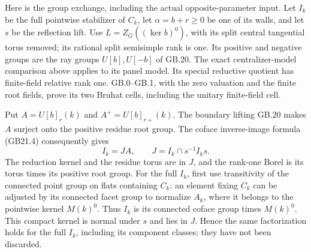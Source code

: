 \documentclass[
  11pt,
]{article}
\begin{document}
Here is the group exchange, including the actual opposite-parameter
input. Let \(I_k\) be the full pointwise stabilizer of \(C_k\), let
\(\alpha=b+r\geq0\) be one of its walls, and let \(s\) be the reflection
lift. Use \(L=Z_G((\ker b)^0)\), with its split central tangential torus
removed; its rational split semisimple rank is one. Its positive and
negative groups are the ray groups \(U[b],U[-b]\) of GB.20. The exact
centralizer-model comparison above applies to its panel model. Its
special reductive quotient has finite-field relative rank one.
GB.0--GB.1, with the zero valuation and the finite root fields, prove
its two Bruhat cells, including the unitary finite-field cell.

Put \(A=U[b]_r(k)\) and \(A^+=U[b]_{r+}(k)\). The boundary lifting GB.20
makes \(A\) surject onto the positive residue root group. The coface
inverse-image formula (GB21.4) consequently gives \[
               I_k=J A,\qquad
               J=I_k\cap s^{-1}I_ks .
\] The reduction kernel and the residue torus are in \(J\), and the
rank-one Borel is its torus times its positive root group. For the full
\(I_k\), first use transitivity of the connected point group on flats
containing \(C_k\): an element fixing \(C_k\) can be adjusted by its
connected facet group to normalize \(A_k\), where it belongs to the
pointwise kernel \(M(k)^0\). Thus \(I_k\) is its connected coface group
times \(M(k)^0\). This compact kernel is normal under \(s\) and lies in
\(J\). Hence the same factorization holds for the full \(I_k\),
including its component classes; they have not been discarded.
\end{document}
